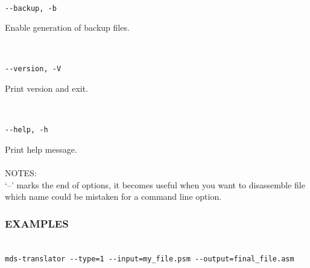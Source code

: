                                 {
                ~\\
                \usecodefont

                \verb'--backup, -b'\\
                }
                Enable generation of backup files.
                {
                ~\\
                \usecodefont

                \verb'--version, -V'\\
                }
                Print version and exit.
                {
                ~\\
                \usecodefont

                \verb'--help, -h'\\
                }
                Print help message.\\\\
                NOTES:\\
                `--' marks the end of options, it becomes useful when you want to disassemble file which name could be mistaken for a command line option.
            \subsubsection{EXAMPLES}
                {
                ~\\
                \usecodefont
                \verb'mds-translator --type=1 --input=my_file.psm --output=final_file.asm'\\
                }









    